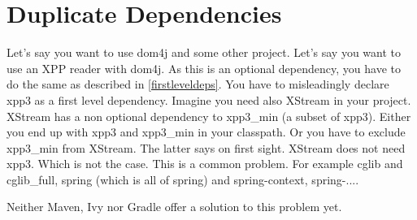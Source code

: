 \section{Duplicate Dependencies} %
\label{sec:duplicate_dependencies}
Let's say you want to use dom4j and some other project. Let's say you want to use an XPP reader with dom4j. As this is an optional dependency, you have to do the same as described in \ref{firstleveldeps}. You have to misleadingly declare xpp3 as a first level dependency. Imagine you need also XStream in your project. XStream has a non optional dependency to xpp3\_min (a subset of xpp3). Either you end up with xpp3 and xpp3\_min in your classpath. Or you have to exclude xpp3\_min from XStream. The latter says on first sight. XStream does not need xpp3. Which is not the case. This is a common problem. For example cglib and cglib\_full, spring (which is all of spring) and spring-context, spring-....

Neither Maven, Ivy nor Gradle offer a solution to this problem yet.


